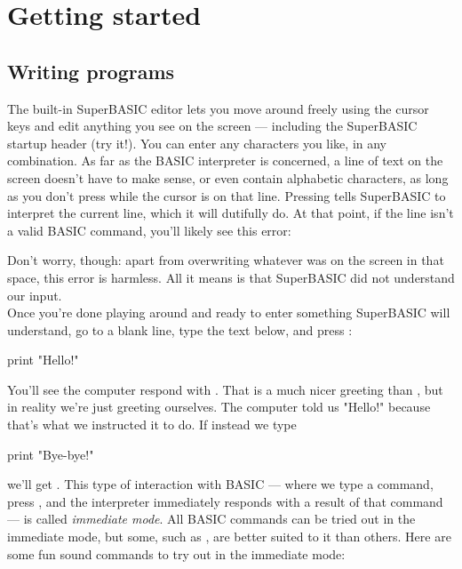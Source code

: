 \chapter{Getting started}

\section {Writing programs}

The built-in SuperBASIC editor lets you move around freely using the cursor keys and edit anything you see on the screen --- including the SuperBASIC startup header (try it!). You can enter any characters you like, in any combination. As far as the BASIC interpreter is concerned, a line of text on the screen doesn't have to make sense, or even contain alphabetic characters, as long as you don't press  while the cursor is on that line. Pressing  tells SuperBASIC to interpret the current line, which it will dutifully do. At that point, if the line isn't a valid BASIC command, you'll likely see this error:


Don't worry, though: apart from overwriting whatever was on the screen in that space, this error is harmless. All it means is that SuperBASIC did not understand our input. \\

Once you're done playing around and ready to enter something SuperBASIC will understand, go to a blank line, type the text below, and press :

\begin{lst}
print "Hello!"
\end{lst}

You'll see the computer respond with . That is a much nicer greeting than , but in reality we're just greeting ourselves. The computer told us "Hello!" because that's what we instructed it to do. If instead we type

\begin{lst}
print "Bye-bye!"
\end{lst}

we'll get . This type of interaction with BASIC --- where we type a command, press , and the interpreter immediately responds with a result of that command --- is called \emph{immediate mode}. All BASIC commands can be tried out in the immediate mode, but some, such as , are better suited to it than others. Here are some fun sound commands to try out in the immediate mode:

